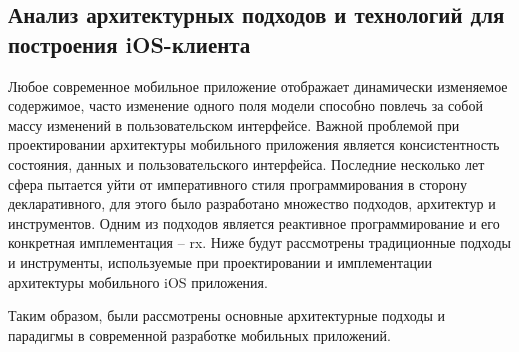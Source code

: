 \subsection{Анализ архитектурных подходов и технологий для построения iOS-клиента}
\label{sec:analysis:research:mobArch}

Любое современное мобильное приложение отображает динамически изменяемое содержимое, часто изменение одного поля модели способно повлечь за собой массу изменений в пользовательском интерфейсе. Важной проблемой при проектировании архитектуры мобильного приложения является консистентность состояния, данных и пользовательского интерфейса. Последние несколько лет сфера пытается уйти от императивного стиля программирования в сторону декларативного, для этого было разработано множество подходов, архитектур и инструментов. Одним из подходов является реактивное программирование и его конкретная имплементация -- \gls{rx}. Ниже будут рассмотрены традиционные подходы и инструменты, используемые при проектировании и имплементации архитектуры мобильного iOS приложения.








Таким образом, были рассмотрены основные архитектурные подходы и парадигмы в современной разработке мобильных приложений.